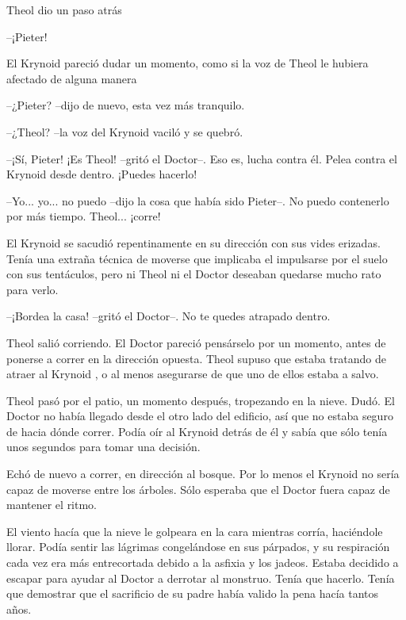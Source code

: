 Theol dio un paso atrás 

--¡Pieter!



El Krynoid pareció dudar un momento, como si la voz de Theol le hubiera afectado de alguna manera 

--¿Pieter? --dijo de nuevo, esta vez más tranquilo.



--¿Theol? --la voz del Krynoid vaciló y se quebró.



--¡Sí, Pieter! ¡Es Theol! --gritó el Doctor--. Eso es, lucha contra él. Pelea contra el Krynoid desde dentro. ¡Puedes hacerlo!



--Yo... yo... no puedo --dijo la cosa que había sido Pieter--. No puedo contenerlo por más tiempo. Theol... ¡corre!



El Krynoid se sacudió repentinamente en su dirección con sus vides erizadas. Tenía una extraña técnica de moverse que implicaba el impulsarse por el suelo con sus tentáculos, pero ni Theol ni el Doctor deseaban quedarse mucho rato para verlo.



--¡Bordea la casa! --gritó el Doctor--. No te quedes atrapado dentro.



Theol salió corriendo. El Doctor pareció pensárselo por un momento, antes de ponerse a correr en la dirección opuesta. Theol supuso que estaba tratando de atraer al Krynoid , o al menos asegurarse de que uno de ellos estaba a salvo.



Theol pasó por el patio, un momento después, tropezando en la nieve. Dudó. El Doctor no había llegado desde el otro lado del edificio, así que no estaba seguro de hacia dónde correr. Podía oír al Krynoid detrás de él y sabía que sólo tenía unos segundos para tomar una decisión.



Echó de nuevo a correr, en dirección al bosque. Por lo menos el Krynoid no sería capaz de moverse entre los árboles. Sólo esperaba que el Doctor fuera capaz de mantener el ritmo.



El viento hacía que la nieve le golpeara en la cara mientras corría, haciéndole llorar. Podía sentir las lágrimas congelándose en sus párpados, y su respiración cada vez era más entrecortada debido a la asfixia y los jadeos. Estaba decidido a escapar para ayudar al Doctor a derrotar al monstruo. Tenía que hacerlo. Tenía que demostrar que el sacrificio de su padre había valido la pena hacía tantos años.



